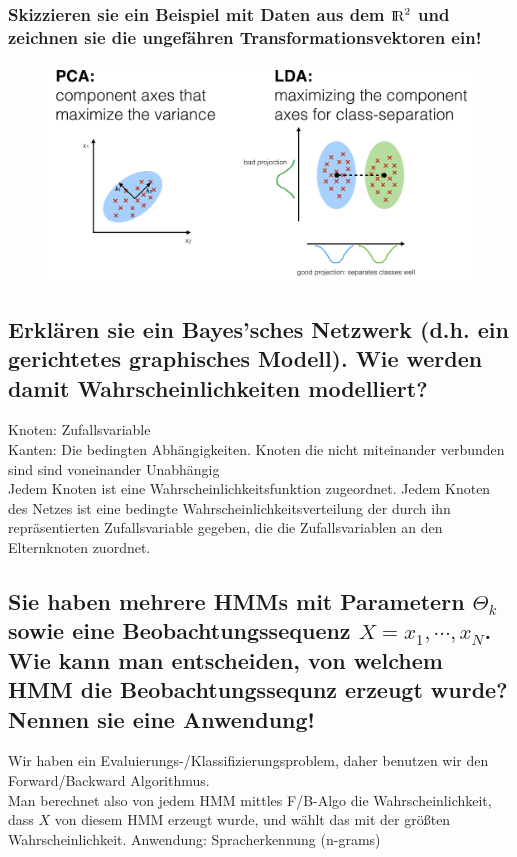 \documentclass[12pt]{scrartcl}
\begin{document}
\subsubsection{Skizzieren sie ein Beispiel mit Daten aus dem ${\rm I\!R}^2$ und zeichnen sie die ungefähren Transformationsvektoren ein!}
\begin{figure}[htb]
  \begin{center}
  \includegraphics[scale=0.35]{pcalda}
  \end{center}
  \vspace{-\baselineskip}
\end{figure}

\subsection{Erklären sie ein Bayes'sches Netzwerk (d.h. ein gerichtetes graphisches Modell). Wie werden damit Wahrscheinlichkeiten modelliert?}

Knoten: Zufallsvariable \\
Kanten: Die bedingten Abhängigkeiten. Knoten die nicht miteinander verbunden sind sind voneinander Unabhängig \\
Jedem Knoten ist eine Wahrscheinlichkeitsfunktion zugeordnet. Jedem Knoten des Netzes ist eine bedingte Wahrscheinlichkeitsverteilung der durch ihn repräsentierten Zufallsvariable gegeben, die die Zufallsvariablen an den Elternknoten zuordnet.

\subsection{Sie haben mehrere HMMs mit Parametern $\Theta_k$ sowie eine Beobachtungssequenz $X = x_1, \cdots , x_N$. Wie kann man entscheiden, von welchem HMM die Beobachtungssequnz erzeugt wurde? Nennen sie eine Anwendung!}
Wir haben ein Evaluierungs-/Klassifizierungsproblem, daher benutzen wir den Forward/Backward Algorithmus. \\
Man berechnet also von jedem HMM mittles F/B-Algo die Wahrscheinlichkeit, dass $X$ von diesem HMM erzeugt wurde, und wählt das mit der größten Wahrscheinlichkeit. Anwendung: Spracherkennung (n-grams) \\
\end{document}
